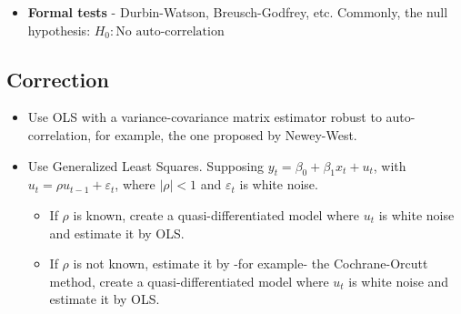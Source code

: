 \documentclass[10pt, a4paper, landscape]{extarticle}
\begin{document}
\begin{multicols}{3}
\begin{itemize}[leftmargin=*]
\begin{multicols}{3}

\end{multicols}

\item \textbf{Formal tests} - Durbin-Watson, Breusch-Godfrey, etc. Commonly, the null hypothesis: $H_0: \text{No auto-correlation}$

\end{itemize}

\subsection*{Correction}

\begin{itemize}[leftmargin=*]
\item Use OLS with a variance-covariance matrix estimator robust to auto-correlation, for example, the one proposed by Newey-West.
\item Use Generalized Least Squares. Supposing $y_t = \beta_0 + \beta_1 x_t + u_t$, with $u_t = \rho u_{t-1} + \varepsilon_t$, where $|\rho| < 1$ and $\varepsilon_t$ is white noise.
\begin{itemize}[leftmargin=*]
\item If $\rho$ is known, create a quasi-differentiated model where $u_t$ is white noise and estimate it by OLS.
\item If $\rho$ is not known, estimate it by -for example- the Cochrane-Orcutt method, create a quasi-differentiated model where $u_t$ is white noise and estimate it by OLS.
\end{itemize}
\end{itemize}

\end{multicols}
\end{document}
